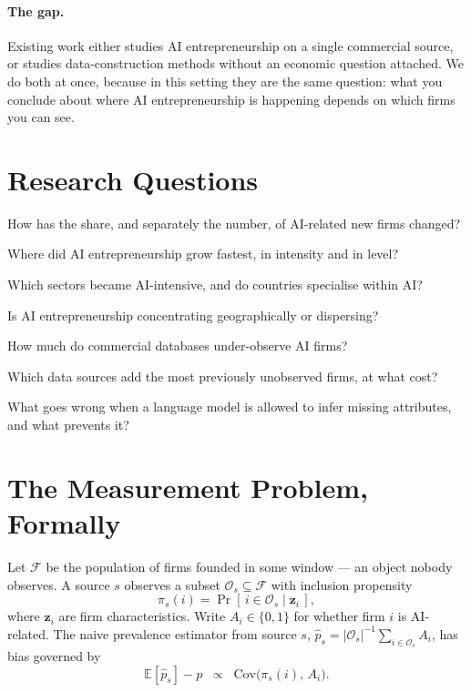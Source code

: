 \documentclass[11pt]{article}
\begin{document}
\paragraph{The gap.} Existing work either studies AI entrepreneurship on a
single commercial source, or studies data-construction methods without an
economic question attached. We do both at once, because in this setting they
are the same question: what you conclude about where AI entrepreneurship is
happening depends on which firms you can see.

\section{Research Questions}

\begin{description}[leftmargin=3.2em,style=nextline,itemsep=1pt]
\item[RQ1 (time)] How has the share, and separately the number, of AI-related
new firms changed?
\item[RQ2 (geography)] Where did AI entrepreneurship grow fastest, in intensity
and in level?
\item[RQ3 (industry)] Which sectors became AI-intensive, and do countries
specialise within AI?
\item[RQ4 (concentration)] Is AI entrepreneurship concentrating geographically
or dispersing?
\item[RQ5 (coverage)] How much do commercial databases under-observe AI firms?
\item[RQ6 (sources)] Which data sources add the most previously unobserved
firms, at what cost?
\item[RQ7 (reliability)] What goes wrong when a language model is allowed to
infer missing attributes, and what prevents it?
\end{description}

\section{The Measurement Problem, Formally}
\label{sec:problem}

Let $\mathcal{F}$ be the population of firms founded in some window --- an
object nobody observes. A source $s$ observes a subset $\mathcal{O}_s
\subseteq \mathcal{F}$ with inclusion propensity
\begin{equation}
\pi_s(i) = \Pr[\, i \in \mathcal{O}_s \mid \mathbf{z}_i \,],
\end{equation}
where $\mathbf{z}_i$ are firm characteristics. Write $A_i \in \{0,1\}$ for
whether firm $i$ is AI-related. The naive prevalence estimator from source $s$,
$\widehat{p}_s = |\mathcal{O}_s|^{-1}\sum_{i \in \mathcal{O}_s} A_i$, has bias
governed by
\begin{equation}
\label{eq:bias}
\mathbb{E}[\widehat{p}_s] - p \;\;\propto\;\; \mathrm{Cov}\big(\pi_s(i),\, A_i\big).
\end{equation}
\end{document}
